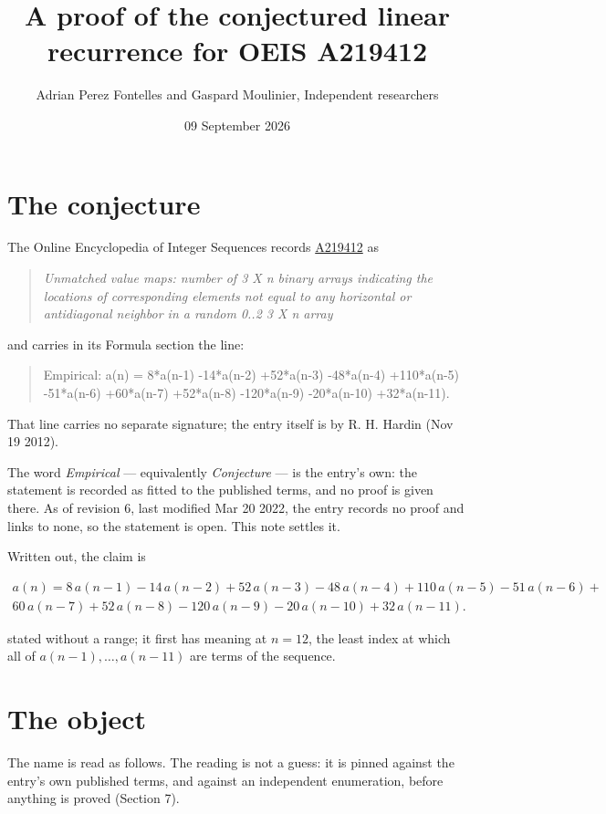 \documentclass[11pt]{article}
\title{A proof of the conjectured linear recurrence for OEIS A219412}
\author{Adrian Perez Fontelles and Gaspard Moulinier, Independent researchers}
\date{09 September 2026}
\theoremstyle{definition}
\begin{document}
\maketitle
\section{The conjecture}

The Online Encyclopedia of Integer Sequences records \href{https://oeis.org/A219412}{A219412} as

\begin{quote}\itshape Unmatched value maps: number of 3 X n binary arrays indicating the locations of corresponding elements not equal to any horizontal or antidiagonal neighbor in a random 0..2 3 X n array\end{quote}

and carries in its Formula section the line:

\begin{quote}\ttfamily Empirical: a(n) = 8*a(n-1) -14*a(n-2) +52*a(n-3) -48*a(n-4) +110*a(n-5) -51*a(n-6) +60*a(n-7) +52*a(n-8) -120*a(n-9) -20*a(n-10) +32*a(n-11).\end{quote}

That line carries no separate signature; the entry itself is by R. H. Hardin (Nov 19 2012).

The word {\itshape Empirical} --- equivalently {\itshape Conjecture} --- is the entry's own: the statement is recorded as fitted to the published terms, and no proof is given there. As of revision 6, last modified Mar 20 2022, the entry records no proof and links to none, so the statement is open. This note settles it.

Written out, the claim is

\begin{multline*} a(n) = 8\,a(n-1) - 14\,a(n-2) + 52\,a(n-3) - 48\,a(n-4) + 110\,a(n-5) - 51\,a(n-6) + \\ 60\,a(n-7) + 52\,a(n-8) - 120\,a(n-9) - 20\,a(n-10) + 32\,a(n-11). \end{multline*}

stated without a range; it first has meaning at $n = 12$, the least index at which all of $a(n-1),\dots,a(n-11)$ are terms of the sequence.

\section{The object}

The name is read as follows. The reading is not a guess: it is pinned against the entry's own published terms, and against an independent enumeration, before anything is proved (Section 7).
\end{document}
